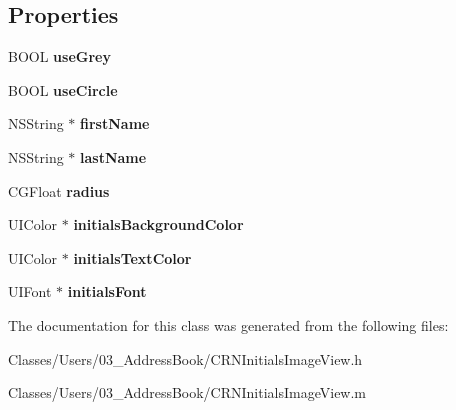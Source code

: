\subsection*{Properties}
\begin{DoxyCompactItemize}
\item 
\hypertarget{interface_c_r_n_initials_image_view_aae99367a4936391ac1f09b901c375fe9}{}B\+O\+O\+L {\bfseries use\+Grey}\label{interface_c_r_n_initials_image_view_aae99367a4936391ac1f09b901c375fe9}

\item 
\hypertarget{interface_c_r_n_initials_image_view_a8b5290c9bf7760280fa6c2669948a08e}{}B\+O\+O\+L {\bfseries use\+Circle}\label{interface_c_r_n_initials_image_view_a8b5290c9bf7760280fa6c2669948a08e}

\item 
\hypertarget{interface_c_r_n_initials_image_view_a594ec61168fd71be8d9d86234e720cc2}{}N\+S\+String $\ast$ {\bfseries first\+Name}\label{interface_c_r_n_initials_image_view_a594ec61168fd71be8d9d86234e720cc2}

\item 
\hypertarget{interface_c_r_n_initials_image_view_aa4b12e32bf8687b93f69a3be34444e91}{}N\+S\+String $\ast$ {\bfseries last\+Name}\label{interface_c_r_n_initials_image_view_aa4b12e32bf8687b93f69a3be34444e91}

\item 
\hypertarget{interface_c_r_n_initials_image_view_a316d9e36e3cf7b13d78d4d7c437f2157}{}C\+G\+Float {\bfseries radius}\label{interface_c_r_n_initials_image_view_a316d9e36e3cf7b13d78d4d7c437f2157}

\item 
\hypertarget{interface_c_r_n_initials_image_view_a11dcaa822a9fa27b1094c7f342d7f995}{}U\+I\+Color $\ast$ {\bfseries initials\+Background\+Color}\label{interface_c_r_n_initials_image_view_a11dcaa822a9fa27b1094c7f342d7f995}

\item 
\hypertarget{interface_c_r_n_initials_image_view_ab2cc86c70e0b256f7e53df4dfbced845}{}U\+I\+Color $\ast$ {\bfseries initials\+Text\+Color}\label{interface_c_r_n_initials_image_view_ab2cc86c70e0b256f7e53df4dfbced845}

\item 
\hypertarget{interface_c_r_n_initials_image_view_a8dbb0bde4cb623fadcc737e9fb3c8eaf}{}U\+I\+Font $\ast$ {\bfseries initials\+Font}\label{interface_c_r_n_initials_image_view_a8dbb0bde4cb623fadcc737e9fb3c8eaf}

\end{DoxyCompactItemize}


The documentation for this class was generated from the following files\+:\begin{DoxyCompactItemize}
\item 
Classes/\+Users/03\+\_\+\+Address\+Book/C\+R\+N\+Initials\+Image\+View.\+h\item 
Classes/\+Users/03\+\_\+\+Address\+Book/C\+R\+N\+Initials\+Image\+View.\+m\end{DoxyCompactItemize}
